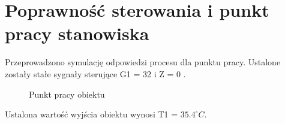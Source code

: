 \section{Poprawność sterowania i punkt pracy stanowiska}
\label{lab:zad1}

Przeprowadzono symulację odpowiedzi procesu dla punktu pracy. 
Ustalone zostały stałe sygnały sterujące G1 = \num{32} i  Z = \num{0} .

\begin{figure}[H] 
    \centering
    
    \caption{Punkt pracy obiektu}
    \label{lab:zad1:figure}
\end{figure}


Ustalona wartość wyjścia obiektu wynosi T1 = $\num{35.4}^{\circ} C$.

\newpage
